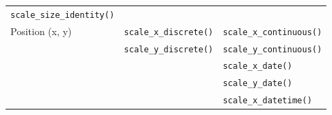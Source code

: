 \documentclass[
  11pt,
]{book}
\numberwithin{equation}{section}
\numberwithin{countremarque}{section}
\begin{document}
\begin{longtable}[]{@{}lll@{}}
\begin{minipage}[t]{0.35\columnwidth}
\texttt{scale\_size\_identity()}\strut
\end{minipage}\tabularnewline
\begin{minipage}[t]{0.22\columnwidth}\raggedright
Position (x, y)\strut
\end{minipage} & \begin{minipage}[t]{0.35\columnwidth}\raggedright
\texttt{scale\_x\_discrete()}\strut
\end{minipage} & \begin{minipage}[t]{0.35\columnwidth}\raggedright
\texttt{scale\_x\_continuous()}\strut
\end{minipage}\tabularnewline
\begin{minipage}[t]{0.22\columnwidth}\raggedright
\strut
\end{minipage} & \begin{minipage}[t]{0.35\columnwidth}\raggedright
\texttt{scale\_y\_discrete()}\strut
\end{minipage} & \begin{minipage}[t]{0.35\columnwidth}\raggedright
\texttt{scale\_y\_continuous()}\strut
\end{minipage}\tabularnewline
\begin{minipage}[t]{0.22\columnwidth}\raggedright
\strut
\end{minipage} & \begin{minipage}[t]{0.35\columnwidth}\raggedright
\strut
\end{minipage} & \begin{minipage}[t]{0.35\columnwidth}\raggedright
\texttt{scale\_x\_date()}\strut
\end{minipage}\tabularnewline
\begin{minipage}[t]{0.22\columnwidth}\raggedright
\strut
\end{minipage} & \begin{minipage}[t]{0.35\columnwidth}\raggedright
\strut
\end{minipage} & \begin{minipage}[t]{0.35\columnwidth}\raggedright
\texttt{scale\_y\_date()}\strut
\end{minipage}\tabularnewline
\begin{minipage}[t]{0.22\columnwidth}\raggedright
\strut
\end{minipage} & \begin{minipage}[t]{0.35\columnwidth}\raggedright
\strut
\end{minipage} & \begin{minipage}[t]{0.35\columnwidth}\raggedright
\texttt{scale\_x\_datetime()}\strut

\end{minipage}
\end{longtable}
\end{document}
